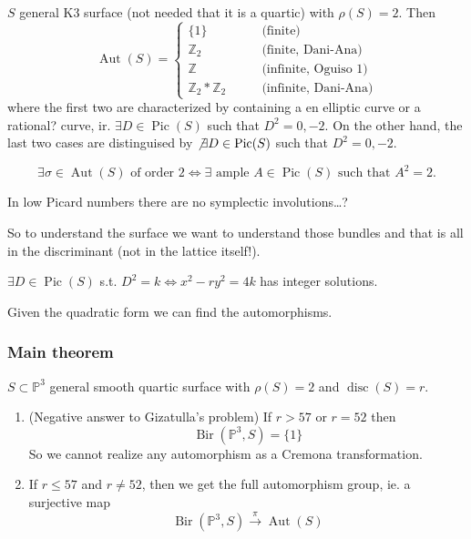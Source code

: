 \begin{prop}
	$S$ general K3 surface (not needed that it is a quartic) with $\rho(S)=2$. Then
	\[\operatorname{Aut}(S)=\begin{cases}
		\{1\}\qquad &\text{(finite)}  \\
		\mathbb{Z}_2\qquad &\text{(finite, Dani-Ana)} \\
		\mathbb{Z}\qquad&\text{(infinite, Oguiso 1)}  \\
		\mathbb{Z}_2*\mathbb{Z}_2\qquad &\text{(infinite, Dani-Ana)} 
	\end{cases}\]
	where the first two are characterized by containing a en elliptic curve or a rational? curve, ir. $\exists D\in\operatorname{Pic}(S)$ such that $D^2=0,-2$. On the other hand, the last two cases are distinguised by $\not\exists D\in\operatorname{Pic}(S)$ such that $D^2=0,-2$.

	\[\exists \sigma\in\operatorname{Aut}(S)\text{ of order 2}\iff \exists  \text{ ample }A\in\operatorname{Pic}(S) \text{ such that }A^2=2.\]
\end{prop}

\begin{remark}
	In low Picard numbers there are no symplectic involutions…?
\end{remark}

So to understand the surface we want to understand those bundles and that is all in the discriminant (not in the lattice itself!).

\begin{remark}
	$\exists D\in\operatorname{Pic}(S)$ s.t. $D^2=k \iff x^2-ry^2=4k$  has integer solutions.
\end{remark}

Given the quadratic form we can find the automorphisms.

\subsubsection{Main theorem}

\begin{thm}\leavevmode
	$S\subset \mathbb{P}^3$ general smooth quartic surface with $\rho(S)=2$ and $\operatorname{disc}(S)=r$.
\begin{enumerate}
	\item (Negative answer to Gizatulla's problem) If $r>57$ or  $r=52$ then
		 \[\operatorname{Bir}(\mathbb{P}^3,S)=\{1\}\]
		 So we cannot realize any automorphism as a Cremona transformation.

	\item If $r\leq 57$ and $r \neq 52$, then we get the full automorphism group, ie. a surjective map
		\[\operatorname{Bir}(\mathbb{P}^3,S)\overset{\pi}{\longrightarrow}\operatorname{Aut}(S)\]
\end{enumerate}
\end{thm}

